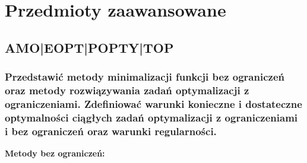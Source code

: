 {\let\clearpage\relax\chapter{Przedmioty zaawansowane}}
\section{AMO|EOPT|POPTY|TOP}
\subsection{Przedstawić metody minimalizacji funkcji bez ograniczeń oraz metody rozwiązywania zadań optymalizacji z ograniczeniami. Zdefiniować warunki konieczne i dostateczne optymalności ciągłych zadań optymalizacji z ograniczeniami i bez ograniczeń oraz warunki regularności.}
\textbf{Metody bez ograniczeń:}

